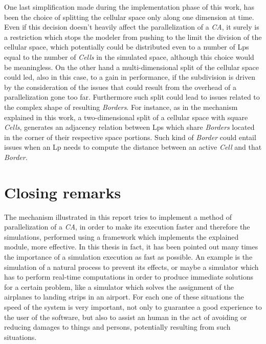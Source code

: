 \documentclass[12pt,a4paper,fleqn]{report}
\begin{document}
 One last simplification made during the implementation phase of this work, has been the choice of splitting the cellular space only along one dimension at time. Even if this decision doesn't heavily affect the parallelization of a \textit{CA}, it surely is a restriction which stops the modeler from pushing to the limit the division of the cellular space, which potentially could be distributed even to a number of Lps equal to the number of \textit{Cells} in the simulated space, although this choice would be meaningless. On the other hand a multi-dimensional split of the cellular space could led, also in this case, to a gain in performance, if the subdivision is driven by the consideration of the issues that could result from the overhead of a parallelization gone too far. Furthermore such split could lead to issues related to the complex shape of resulting \textit{Borders}. For instance, as in the mechanism explained in this work, a two-dimensional split of a cellular space with square \textit{Cells}, generates an adjacency relation between Lps which share \textit{Borders} located in the corner of their respective space portions. Such kind of \textit{Border} could entail issues when an Lp needs to compute the distance between an active \textit{Cell} and that \textit{Border}.
 \section{Closing remarks}
 The mechanism illustrated in this report tries to implement a method of parallelization of a \textit{CA}, in order to make its execution faster and therefore the simulations, performed using a framework which implements the explained module, more effective. In this thesis in fact, it has been pointed out many times the importance of a simulation execution as fast as possible. An example is the simulation of a natural process to prevent its effects, or maybe a simulator which has to perform real-time computations in order to produce immediate solutions for a certain problem, like a simulator which solves the assignment of the airplanes to landing strips in an airport. For each one of these situations the speed of the system is very important, not only to guarantee a good experience to the user of the software, but also to assist an human in the act of avoiding or reducing damages to things and persons, potentially resulting from such situations.
\nocite{0}
\nocite{1}
\nocite{2}
\nocite{3}
\nocite{4}
\printbibliography{}
\end{document}
